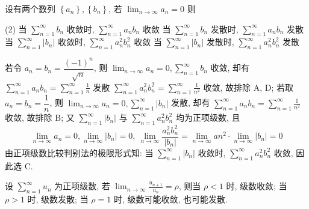 \begin{example}[2009 数一]
    设有两个数列 $ \left\{a_{n}\right\},\left\{b_{n}\right\}$, 若 $\displaystyle \lim _{n \to \infty} a_{n}=0 $ 则
    \begin{tasks}(2)
        \task 当 $\displaystyle \sum_{n=1}^{\infty} b_{n} $ 收敛时, $\displaystyle \sum_{n=1}^{\infty} a_{n} b_{n} $ 收敛
        \task 当 $\displaystyle \sum_{n=1}^{\infty} b_{n} $ 发散时, $\displaystyle \sum_{n=1}^{\infty} a_{n} b_{n} $ 发散
        \task 当 $\displaystyle \sum_{n=1}^{\infty}\left|b_{n}\right| $ 收敛时, $\displaystyle \sum_{n=1}^{\infty} a_{n}^{2} b_{n}^{2} $ 收敛
        \task 当 $\displaystyle \sum_{n=1}^{\infty}\left|b_{n}\right| $ 发散时, $\displaystyle \sum_{n=1}^{\infty} a_{n}^{2} b_{n}^{2} $ 发散
    \end{tasks}
\end{example}
\begin{solution}
    若令 $ a_{n}=b_{n}=\dfrac{(-1)^{n}}{\sqrt{n}}$, 则 $\displaystyle \lim _{n \to \infty} a_{n}=0, \sum_{n=1}^{\infty} b_{n} $ 收敛,
    却有 $\displaystyle  \sum_{n=1}^{\infty} a_{n} b_{n}=\sum_{n=1}^{\infty} \frac{1}{n} $ 发散 $\displaystyle \sum_{n=1}^{\infty} a_{n}^{2} b_{n}^{2}=\sum_{n=1}^{\infty} \frac{1}{n^{2}} $ 收敛,
    故排除 A, D;
    若取 $ a_{n}=b_{n}=\dfrac{1}{n} $, 则 $\displaystyle  \lim _{n \to \infty} a_{n}=0, \sum_{n=1}^{\infty}\left|b_{n}\right| $ 发散,
    却有 $\displaystyle \sum_{n=1}^{\infty} a_{n} b_{n}=\sum_{n=1}^{\infty} \frac{1}{n^{2}} $ 收敛, 故排除 B;
    又 $\displaystyle \sum_{n=1}^{\infty}\left|b_{n}\right| $ 与 $\displaystyle \sum_{n=1}^{\infty} a_{n}^{2} b_{n}^{2} $ 均为正项级数, 且
    $$\displaystyle\lim _{n \to \infty} a_{n}=0, \lim _{n \to \infty}\left|b_{n}\right|=0 ,~\lim_{n\to\infty}\dfrac{a_n^2b_n^2}{|b_n|}=\lim_{n\to\infty}an^2\cdot\lim_{n\to\infty}|b_n|=0$$
    由正项级数比较判别法的极限形式知: 当 $\displaystyle\sum_{n=1}^{\infty}|b_n|$ 收敛时, $\displaystyle\sum_{n=1}^{\infty}a_n^2b_n^2$ 收敛, 因此选 C.
\end{solution}

\begin{theorem}[比值审敛法]
    设 $\displaystyle  \sum_{n=1}^{\infty} u_{n} $ 为正项级数, 若 $\displaystyle  \lim _{n \to \infty} \frac{u_{n+1}}{u_{n}}=\rho $, 则当 $ \rho<1 $ 时, 级数收敛;
    当 $ \rho>1 $ 时, 级数发散; 当 $ \rho=1 $ 时, 级数可能收敛, 也可能发散.
\end{theorem}

